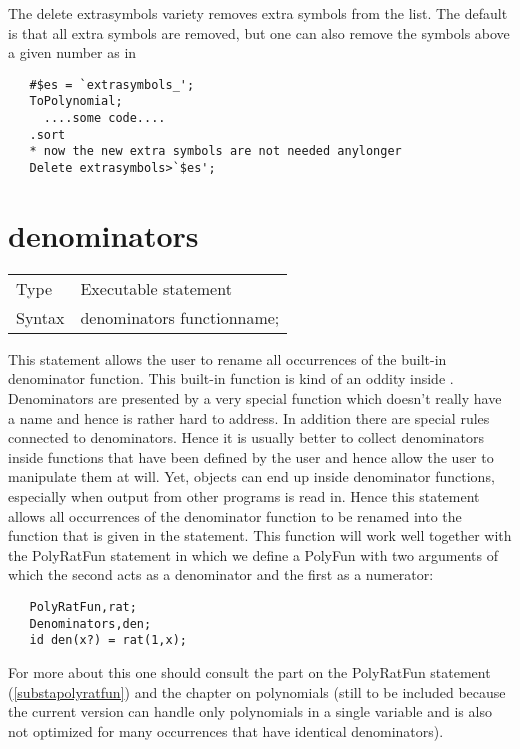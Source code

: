 \noindent The delete extrasymbols\index{} variety removes 
extra symbols from the list. The default is that all 
extra symbols are removed, but one can also remove the symbols above a 
given number as in
\begin{verbatim}
   #$es = `extrasymbols_';
   ToPolynomial;
     ....some code....
   .sort
   * now the new extra symbols are not needed anylonger
   Delete extrasymbols>`$es';
\end{verbatim}
\vspace{10mm}


\section{denominators}
\label{substadenominators}

\noindent \begin{tabular}{ll}
Type & Executable statement\\
Syntax & denominators functionname;
\end{tabular} \vspace{4mm}

\noindent This statement allows the user to rename all 
occurrences of the built-in denominator function. This built-in function is 
kind of an oddity inside \FORM. Denominators are presented by a very special 
function which doesn't really have a name and hence is rather hard to 
address. In addition there are special rules connected to denominators. 
Hence it is usually better to collect denominators inside functions that 
have been defined by the user and hence allow the user to manipulate them 
at will. Yet, objects can end up inside denominator functions, especially 
when output from other programs is read in. Hence this statement allows all 
occurrences of the denominator function to be renamed into the function 
that is given in the statement. This function will work well together with 
the PolyRatFun statement in which we define a PolyFun with two arguments of 
which the second acts as a denominator and the first as a numerator:
\begin{verbatim}
   PolyRatFun,rat;
   Denominators,den;
   id den(x?) = rat(1,x);
\end{verbatim}
For more about this one should consult the part on the 
PolyRatFun statement 
(\ref{substapolyratfun}) and the chapter on polynomials (still to be 
included because the current version can handle only polynomials in a 
single variable and is also not optimized for many occurrences that have 
identical denominators).
\vspace{10mm}

